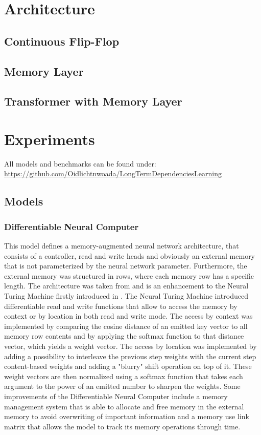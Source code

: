 \documentclass[draft,final]{vutinfth} %
\begin{document}

\chapter{Architecture}
\section{Continuous Flip-Flop}
\section{Memory Layer}
\section{Transformer with Memory Layer}



\chapter{Experiments}
All models and benchmarks can be found under: \\
\url{https://github.com/Oidlichtnwoada/LongTermDependenciesLearning}
\section{Models}
\subsection{Differentiable Neural Computer} \label{Differentiable Neural Computer}
This model defines a memory-augmented neural network architecture, that consists of a controller, read and write heads and obviously an external memory that is not parameterized by the neural network parameter. 
Furthermore, the external memory was structured in rows, where each memory row has a specific length.
The architecture was taken from \cite{DNC} and is an enhancement to the Neural Turing Machine firstly introduced in \cite{NTM}. 
The Neural Turing Machine introduced differentiable read and write functions that allow to access the memory by context or by location in both read and write mode.
The access by context was implemented by comparing the cosine distance of an emitted key vector to all memory row contents and by applying the softmax function to that distance vector, which yields a weight vector. 
The access by location was implemented by adding a possibility to interleave the previous step weights with the current step content-based weights and adding a "blurry" shift operation on top of it. 
These weight vectors are then normalized using a softmax function that takes each argument to the power of an emitted number to sharpen the weights.
Some improvements of the Differentiable Neural Computer include a memory management system that is able to allocate and free memory in the external memory to avoid overwriting of important information and a memory use link matrix that allows the model to track its memory operations through time.
\end{document}
